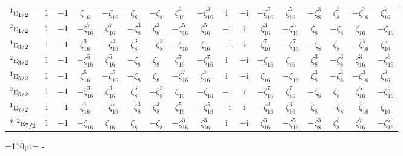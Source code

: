 \documentclass[10pt,a4paper]{article}
\newcommand{\needspace}[1]{\par\penalty-100\begingroup\dimen0=#1\relax\dimen2=\pagegoal
  \advance\dimen2-\pagetotal\ifdim\dimen0>\dimen2\relax\ifdim\dimen2>0pt\vfil\break\fi\fi
  \endgroup}
\numberwithin{equation}{section}
\newcommand{\irr}[1]{\text{\normalfont\scshape #1}}
\newcommand{\conjpair}[1]{{}^{#1}}
\newcommand{\iunit}{\mathrm{i}}
\newcommand{\rootunity}[1]{\zeta_{#1}}
\begin{document}
{\begin{longtable}{@{}lcccccccccccccccc@{}}
$\conjpair{1}\irr{e}_{1/2}$ & $1$ & $-1$ & $\rootunity{16}$ & $-\rootunity{16}$ & $\rootunity{8}$ & $-\rootunity{8}$ & $\rootunity{16}^{3}$ & $-\rootunity{16}^{3}$ & $\iunit{}$ & $-\iunit{}$ & $-\rootunity{16}^{5}$ & $\rootunity{16}^{5}$ & $-\rootunity{8}^{3}$ & $\rootunity{8}^{3}$ & $-\rootunity{16}^{7}$ & $\rootunity{16}^{7}$\\
$\conjpair{2}\irr{e}_{1/2}$ & $1$ & $-1$ & $-\rootunity{16}^{7}$ & $\rootunity{16}^{7}$ & $-\rootunity{8}^{3}$ & $\rootunity{8}^{3}$ & $-\rootunity{16}^{5}$ & $\rootunity{16}^{5}$ & $-\iunit{}$ & $\iunit{}$ & $\rootunity{16}^{3}$ & $-\rootunity{16}^{3}$ & $\rootunity{8}$ & $-\rootunity{8}$ & $\rootunity{16}$ & $-\rootunity{16}$\\
$\conjpair{1}\irr{e}_{3/2}$ & $1$ & $-1$ & $\rootunity{16}^{3}$ & $-\rootunity{16}^{3}$ & $\rootunity{8}^{3}$ & $-\rootunity{8}^{3}$ & $-\rootunity{16}$ & $\rootunity{16}$ & $-\iunit{}$ & $\iunit{}$ & $\rootunity{16}^{7}$ & $-\rootunity{16}^{7}$ & $-\rootunity{8}$ & $\rootunity{8}$ & $-\rootunity{16}^{5}$ & $\rootunity{16}^{5}$\\
$\conjpair{2}\irr{e}_{3/2}$ & $1$ & $-1$ & $-\rootunity{16}^{5}$ & $\rootunity{16}^{5}$ & $-\rootunity{8}$ & $\rootunity{8}$ & $\rootunity{16}^{7}$ & $-\rootunity{16}^{7}$ & $\iunit{}$ & $-\iunit{}$ & $-\rootunity{16}$ & $\rootunity{16}$ & $\rootunity{8}^{3}$ & $-\rootunity{8}^{3}$ & $\rootunity{16}^{3}$ & $-\rootunity{16}^{3}$\\
$\conjpair{1}\irr{e}_{5/2}$ & $1$ & $-1$ & $\rootunity{16}^{5}$ & $-\rootunity{16}^{5}$ & $-\rootunity{8}$ & $\rootunity{8}$ & $-\rootunity{16}^{7}$ & $\rootunity{16}^{7}$ & $\iunit{}$ & $-\iunit{}$ & $\rootunity{16}$ & $-\rootunity{16}$ & $\rootunity{8}^{3}$ & $-\rootunity{8}^{3}$ & $-\rootunity{16}^{3}$ & $\rootunity{16}^{3}$\\
$\conjpair{2}\irr{e}_{5/2}$ & $1$ & $-1$ & $-\rootunity{16}^{3}$ & $\rootunity{16}^{3}$ & $\rootunity{8}^{3}$ & $-\rootunity{8}^{3}$ & $\rootunity{16}$ & $-\rootunity{16}$ & $-\iunit{}$ & $\iunit{}$ & $-\rootunity{16}^{7}$ & $\rootunity{16}^{7}$ & $-\rootunity{8}$ & $\rootunity{8}$ & $\rootunity{16}^{5}$ & $-\rootunity{16}^{5}$\\
$\conjpair{1}\irr{e}_{7/2}$ & $1$ & $-1$ & $\rootunity{16}^{7}$ & $-\rootunity{16}^{7}$ & $-\rootunity{8}^{3}$ & $\rootunity{8}^{3}$ & $\rootunity{16}^{5}$ & $-\rootunity{16}^{5}$ & $-\iunit{}$ & $\iunit{}$ & $-\rootunity{16}^{3}$ & $\rootunity{16}^{3}$ & $\rootunity{8}$ & $-\rootunity{8}$ & $-\rootunity{16}$ & $\rootunity{16}$\\*
$\conjpair{2}\irr{e}_{7/2}$ & $1$ & $-1$ & $-\rootunity{16}$ & $\rootunity{16}$ & $\rootunity{8}$ & $-\rootunity{8}$ & $-\rootunity{16}^{3}$ & $\rootunity{16}^{3}$ & $\iunit{}$ & $-\iunit{}$ & $\rootunity{16}^{5}$ & $-\rootunity{16}^{5}$ & $-\rootunity{8}^{3}$ & $\rootunity{8}^{3}$ & $\rootunity{16}^{7}$ & $-\rootunity{16}^{7}$\\
\bottomrule\end{longtable}}
\needspace{110pt}
\end{document}
